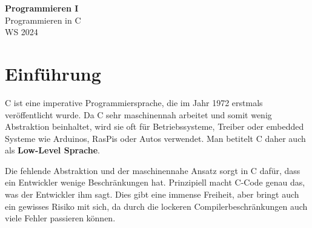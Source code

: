 \documentclass[11pt]{article}
\begin{document}
\thispagestyle{empty}

\newtheorem{anmk}{Anmerkung}[section]
\newtheorem{bsp}{Beispiel}[section]

\renewcommand{\figurename}{Fig.}

\newcommand{\ol}[1]{\begin{enumerate}#1\end{enumerate}}
\newcommand{\ul}[1]{\begin{itemize}#1\end{itemize}}
\newcommand{\li}[1]{\item{#1}}
\newcommand{\equivto}{\Longleftrightarrow}
\newcommand{\sube}{\subseteq}

\newcommand{\N}{\mathbb{N}}
\newcommand{\Z}{\mathbb{Z}}
\newcommand{\R}{\mathbb{R}}

\begin{center}
  {\LARGE \bf Programmieren I}\\
  {\Large Programmieren in C}\\
  WS 2024
\end{center}

\section{Einführung}
C ist eine imperative Programmiersprache, die im Jahr 1972 erstmals veröffentlicht wurde. Da C sehr maschinennah arbeitet
und somit wenig Abstraktion beinhaltet, wird sie oft für Betriebssysteme, Treiber oder embedded Systeme wie Arduinos,
RasPis oder Autos verwendet. Man betitelt C daher auch als \textbf{Low-Level Sprache}.

Die fehlende Abstraktion und der maschinennahe Ansatz sorgt in C dafür, dass ein Entwickler wenige Beschränkungen hat.
Prinzipiell macht C-Code genau das, was der Entwickler ihm sagt. Dies gibt eine immense Freiheit, aber bringt auch ein
gewisses Risiko mit sich, da durch die lockeren Compilerbeschränkungen auch viele Fehler passieren können.
\end{document}
